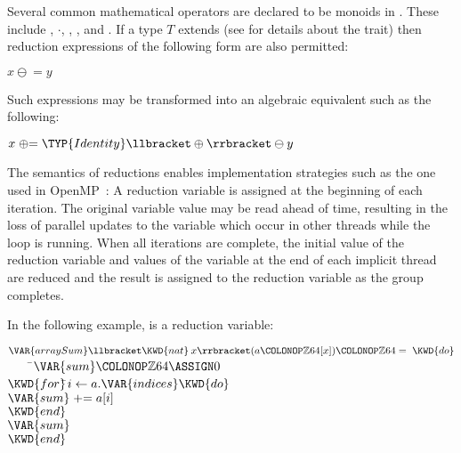 Several common mathematical operators are declared to be monoids in
\library.  These include \EXP{+}, $\cdot$, \EXP{\wedge}, \EXP{\vee},
and \EXP{\xor}.  If a type $T$ extends
(see  for details about the
 trait)
then reduction expressions of the following form are also permitted:
\begin{Fortress}
\(x \mathrel{\ominus}= y\)
\end{Fortress}
Such expressions may be transformed into an algebraic equivalent such
as the following:
\begin{Fortress}
\(x \mathrel{\oplus}= \TYP{Identity}\llbracket\oplus\rrbracket \ominus y\)
\end{Fortress}

The semantics of reductions enables implementation strategies such as
the one used in OpenMP~\cite{OpenMP}: A reduction variable  is
assigned 
at the beginning of each iteration.  The
original variable value may be read ahead of time, resulting in the
loss of parallel updates to the variable which occur in other threads
while the loop is running.  When all iterations are complete, the
initial value of the reduction variable and values of the variable at
the end of each implicit thread are reduced and the result is assigned
to the reduction variable as the group completes.

In the following example,  is a reduction variable:
\begin{Fortress}
\(\VAR{arraySum}\llbracket\KWD{nat}\mskip 4mu plus 4mu{x}\rrbracket(a\COLONOP\mathbb{Z}64[x])\COLONOP\mathbb{Z}64 = \;\KWD{do}\)\\
{\tt~~~~}\pushtabs\=\+\(    \VAR{sum}\COLONOP\mathbb{Z}64 \ASSIGN 0\)\\
\(    \KWD{for}  \null\)\pushtabs\=\+\(i\leftarrow{}a.\VAR{indices} \KWD{do}\)\\
\(        \VAR{sum}\mathrel{+}=a[i]\)\-\\\poptabs
\(    \KWD{end}\)\\
\(    \VAR{sum}\)\-\\\poptabs
\(\KWD{end}\)
\end{Fortress}

